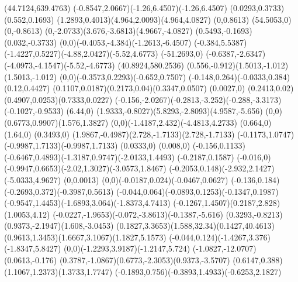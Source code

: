 {    \moveto(44.7124,639.4763)
    \rcurveto(-0.8547,2.0667)(-1.26,6.4507)(-1.26,6.4507)
    \rlineto(0.0293,0.3733)
    \rlineto(0.552,0.1693)
    \rcurveto(1.2893,0.4013)(4.964,2.0093)(4.964,4.0827)
    \rlineto(0,0.8613)
    \rlineto(54.5053,0)
    \rlineto(0,-0.8613)
    \rcurveto(0,-2.0733)(3.676,-3.6813)(4.9667,-4.0827)
    \rlineto(0.5493,-0.1693)
    \rlineto(0.032,-0.3733)
    \rcurveto(0,0)(-0.4053,-4.384)(-1.2613,-6.4507)
    \rlineto(-0.384,5.5387)
    \rcurveto(-1.4227,0.5227)(-4.88,2.0427)(-5.52,4.6773)
    \rlineto(-51.2693,0)
    \rcurveto(-0.6387,-2.6347)(-4.0973,-4.1547)(-5.52,-4.6773)
    \closepath
    \moveto(40.8924,580.2536)
    \rcurveto(0.556,-0.912)(1.5013,-1.012)(1.5013,-1.012)
    \rcurveto(0,0)(-0.3573,0.2293)(-0.652,0.7507)
    \rcurveto(-0.148,0.264)(-0.0333,0.384)(0.12,0.4427)
    \rcurveto(0.1107,0.0187)(0.2173,0.04)(0.3347,0.0507)
    \rlineto(0.0027,0)
    \rcurveto(0.2413,0.02)(0.4907,0.0253)(0.7333,0.0227)
    \rcurveto(-0.156,-2.0267)(-0.2813,-3.252)(-0.288,-3.3173)
    \rlineto(-0.1027,-0.9533)
    \rlineto(6.44,0)
    \rcurveto(1.9333,-0.8027)(5.8293,-2.8093)(4.9587,-5.656)
    \rcurveto(0,0)(0.6773,0.9907)(1.576,1.3827)
    \rcurveto(0,0)(-1.4187,2.432)(-4.4813,4.2733)
    \rlineto(0.664,0)
    \rlineto(1.64,0)
    \rlineto(0.3493,0)
    \rcurveto(1.9867,-0.4987)(2.728,-1.7133)(2.728,-1.7133)
    \rcurveto(-0.1173,1.0747)(-0.9987,1.7133)(-0.9987,1.7133)
    \rlineto(0.0333,0)
    \rlineto(0.008,0)
    \rlineto(-0.156,0.1133)
    \rcurveto(-0.6467,0.4893)(-1.3187,0.9747)(-2.0133,1.4493)
    \rlineto(-0.2187,0.1587)
    \rlineto(-0.016,0)
    \rcurveto(-0.9947,0.6653)(-2.02,1.3027)(-3.0573,1.8467)
    \rcurveto(-0.2053,0.148)(-2.932,2.1427)(-5.0333,4.9627)
    \rlineto(0,0.0013)
    \rcurveto(0,0)(-0.0187,0.024)(-0.0467,0.0627)
    \rcurveto(-0.136,0.184)(-0.2693,0.372)(-0.3987,0.5613)
    \rcurveto(-0.044,0.064)(-0.0893,0.1253)(-0.1347,0.1987)
    \rcurveto(-0.9547,1.4453)(-1.6893,3.064)(-1.8373,4.7413)
    \rcurveto(-0.1267,1.4507)(0.2187,2.828)(1.0053,4.12)
    \rcurveto(-0.0227,-1.9653)(-0.072,-3.8613)(-0.1387,-5.616)
    \rcurveto(0.3293,-0.8213)(0.9373,-2.1947)(1.608,-3.0453)
    \rcurveto(0.1827,3.3653)(1.588,32.34)(0.1427,40.4613)
    \rcurveto(0.9613,1.3453)(1.6667,3.1067)(1.1827,5.1573)
    \rcurveto(-0.044,0.124)(-1.4267,3.376)(-1.8347,5.8427)
    \rcurveto(0,0)(-1.2293,3.9187)(-1.2147,5.724)
    \rlineto(-1.0827,-12.0707)
    \rlineto(0.0613,-0.176)
    \rcurveto(0.3787,-1.0867)(0.6773,-2.3053)(0.9373,-3.5707)
    \rcurveto(0.6147,0.388)(1.1067,1.2373)(1.3733,1.7747)
    \rcurveto(-0.1893,0.756)(-0.3893,1.4933)(-0.6253,2.1827)
}

